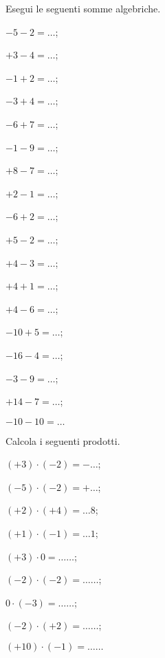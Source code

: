 \begin{esercizio}
 \label{ese:2.14}
Esegui le seguenti somme algebriche.
\begin{multicols}{3}
 \begin{enumeratea}
 \item $-5 -2 = \ldots$;
 \item $+3 -4 = \ldots$;
 \item $-1 +2 = \ldots$;
 \item $-3 +4 = \ldots$;
 \item $-6 +7 = \ldots$;
 \item $-1 -9 = \ldots$;
 \item $+8 -7 = \ldots$;
 \item $+2 -1 = \ldots$;
 \item $-6 +2 = \ldots$;
 \item $+5 -2 = \ldots$;
 \item $+4 -3 = \ldots$;
 \item $+4 +1 = \ldots$;
 \item $+4 -6 = \ldots$;
 \item $-10 +5 = \ldots$;
 \item $-16 -4 = \ldots$;
 \item $-3 -9 = \ldots$;
 \item $+14 -7 = \ldots$;
 \item $-10 -10 = \ldots$
 \end{enumeratea}

\end{multicols}

\end{esercizio}

\begin{esercizio}
 \label{ese:2.15}
Calcola i seguenti prodotti.
\begin{multicols}{3}
 \begin{enumeratea}
 \item $(+3)\cdot(-2) =-\ldots$;
 \item $(-5)\cdot(-2)=+\ldots$;
 \item $(+2)\cdot(+4) =\ldots8$;
 \item $(+1)\cdot(-1) =\ldots1$;
 \item $(+3)\cdot0 = \ldots\ldots$;
 \item $(-2)\cdot(-2) =\ldots\ldots$;
 \item $0\cdot(-3) = \ldots\ldots$;
 \item $(-2)\cdot(+2) =\ldots\ldots$;
 \item $(+10)\cdot(-1) =\ldots\ldots$

 \end{enumeratea}
\end{multicols}
\end{esercizio}

